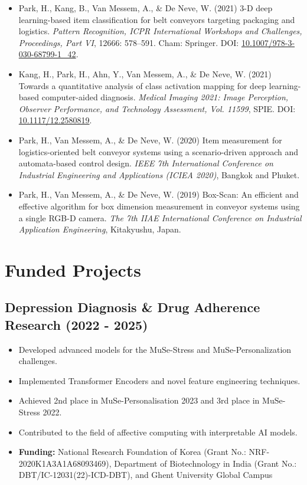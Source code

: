 \documentclass[11pt]{article}
\begin{document}
\begin{itemize}
    \item[\checkmark] Park, H., Kang, B., Van Messem, A., \& De Neve, W. (2021) 3-D deep learning-based item classification for belt conveyors targeting packaging and logistics. \textit{Pattern Recognition, ICPR International Workshops and Challenges, Proceedings, Part VI}, 12666: 578–591. Cham: Springer. DOI: \href{https://doi.org/10.1007/978-3-030-68799-1_42}{10.1007/978-3-030-68799-1\_42}.
    \item[\checkmark] Kang, H., Park, H., Ahn, Y., Van Messem, A., \& De Neve, W. (2021) Towards a quantitative analysis of class activation mapping for deep learning-based computer-aided diagnosis. \textit{Medical Imaging 2021: Image Perception, Observer Performance, and Technology Assessment, Vol. 11599}, SPIE. DOI: \href{https://doi.org/10.1117/12.2580819}{10.1117/12.2580819}.
    \item[\checkmark] Park, H., Van Messem, A., \& De Neve, W. (2020) Item measurement for logistics-oriented belt conveyor systems using a scenario-driven approach and automata-based control design. \textit{IEEE 7th International Conference on Industrial Engineering and Applications (ICIEA 2020)}, Bangkok and Phuket.
    \item[\checkmark] Park, H., Van Messem, A., \& De Neve, W. (2019) Box-Scan: An efficient and effective algorithm for box dimension measurement in conveyor systems using a single RGB-D camera. \textit{The 7th IIAE International Conference on Industrial Application Engineering}, Kitakyushu, Japan.
\end{itemize}

\section{Funded Projects}
\subsection{Depression Diagnosis \& Drug Adherence Research (2022 - 2025)}
\begin{itemize}
    \item[\checkmark] Developed advanced models for the MuSe-Stress and MuSe-Personalization challenges.
    \item[\checkmark] Implemented Transformer Encoders and novel feature engineering techniques.
    \item[\checkmark] Achieved 2nd place in MuSe-Personalisation 2023 and 3rd place in MuSe-Stress 2022.
    \item[\checkmark] Contributed to the field of affective computing with interpretable AI models.
    \item[\checkmark] \textbf{Funding:} National Research Foundation of Korea (Grant No.: NRF-2020K1A3A1A68093469), Department of Biotechnology in India (Grant No.: DBT/IC-12031(22)-ICD-DBT), and Ghent University Global Campus
\end{itemize}
\end{document}

